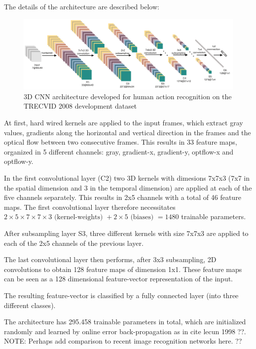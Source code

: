 The details of the architecture are described below:

\begin{figure}[H]
    \centering
    \includegraphics[width=\textwidth]{img_deep/3dconv_architecture}
    \caption{3D CNN architecture developed for human action recognition on the TRECVID 2008 development dataset \cite{ji_3d_2013}}
    \label{fig:3dconv_architecture}
\end{figure}

At first, hard wired kernels are applied to the input frames, which extract gray values, gradients along the horizontal and vertical direction in the frames and the optical flow between two consecutive frames. This results in 33 feature maps, organized in 5 different channels: gray, gradient-x, gradient-y, optflow-x and optflow-y.

In the first convolutional layer (C2) two 3D kernels with dimesions 7x7x3 (7x7 in the spatial dimension and 3 in the temporal dimension) are applied at each of the five channels separately. 
This results in 2x5 channels with a total of 46 feature maps.
The first convolutional layer therefore necessitates $2 \times 5 \times 7 \times 7 \times 3 \text{ (kernel-weights) } + 2 \times 5 \text{ (biases) } = 1480$ trainable parameters. 

After subsampling layer S3, three different kernels with size 7x7x3 are applied to each of the 2x5 channels of the previous layer.

The last convolutional layer then performs, after 3x3 subsampling, 2D convolutions to obtain 128 feature maps of dimension 1x1.
These feature maps can be seen as a 128 dimensional feature-vector representation of the input.

The resulting feature-vector is classified by a fully connected layer (into three different classes).

The architecture has 295.458 trainable parameters in total, which are initialized randomly and learned by online error back-propagation as in cite lecun 1998 ??.
NOTE: Perhaps add comparison to recent image recognition networks here. ??

